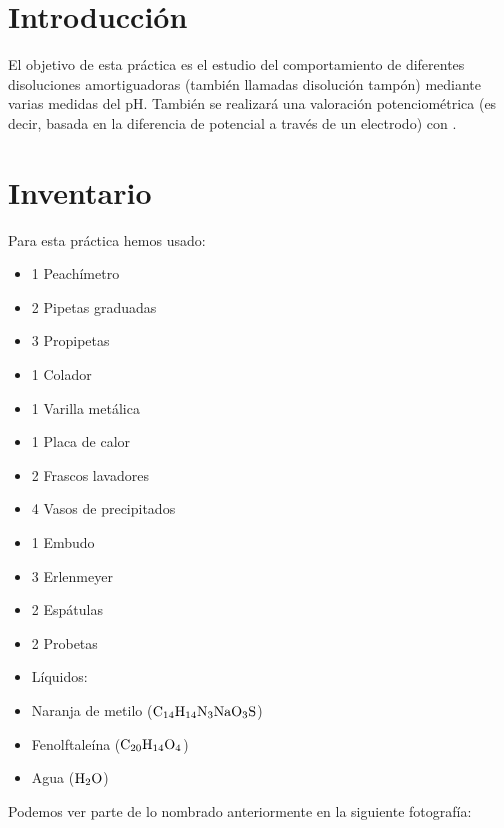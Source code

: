 \section{Introducción}
\noindent El objetivo de esta práctica es el estudio del comportamiento de diferentes disoluciones amortiguadoras (también llamadas disolución tampón) mediante varias medidas del pH. También se realizará una valoración potenciométrica (es decir, basada en la diferencia de potencial a través de un electrodo) con .
\section{Inventario}
\vspace{0.4cm}
Para esta práctica hemos usado:

\begin{multicols}{2}
    \begin{itemize}
        \item 1 Peachímetro
        \item 2 Pipetas graduadas
        \item 3 Propipetas
        \item 1 Colador
        \item 1 Varilla metálica
        \item 1 Placa de calor
        \item 2 Frascos lavadores
        \item 4 Vasos de precipitados
        \item 1 Embudo
        \item 3 Erlenmeyer
        \item 2 Espátulas
        \item 2 Probetas
        \item Líquidos: 
        \item Naranja de metilo ($\ce{C14H14N3NaO3S}$)
        \item Fenolftaleína ($\ce{C20H14O4}$)
        \item Agua ($\ce{H2O}$)
    \end{itemize}
\end{multicols}

\vspace{0.3cm}
Podemos ver parte de lo nombrado anteriormente en la siguiente fotografía:

